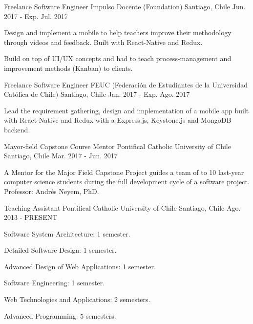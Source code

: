 \begin{cventries}
  \cventry
    {Freelance Software Engineer}
    {Impulso Docente (Foundation)}
    {Santiago, Chile}
    {Jun. 2017 - Exp. Jul. 2017}
    {
      \begin{cvitems}
        \item {Design and implement a mobile to help teachers improve their methodology through videos and feedback. Built with React-Native and Redux.}
        \item {Build on top of UI/UX concepts and had to teach process-management and improvement methods (Kanban) to clients.}
      \end{cvitems}
    }
  \cventry
    {Freelance Software Engineer}
    {FEUC (Federación de Estudiantes de la Universidad Católica de Chile)}
    {Santiago, Chile}
    {Jan. 2017 - Exp. Ago. 2017}
    {
      \begin{cvitems}
        \item {Lead the requirement gathering, design and implementation of a mobile app built with React-Native and Redux with a Express.js, Keystone.js and MongoDB backend.}
      \end{cvitems}
    }
  \cventry
    {Mayor-field Capstone Course Mentor}
    {Pontifical Catholic University of Chile}
    {Santiago, Chile}
    {Mar. 2017 - Jun. 2017}
    {
      \begin{cvitems}
        \item {A Mentor for the Major Field Capstone Project guides a team of to 10 last-year computer science students during the full development cycle of a software project. Professor: Andrés Neyem, PhD.}
      \end{cvitems}
    }
  \cventry
    {Teaching Assistant}
    {Pontifical Catholic University of Chile}
    {Santiago, Chile}
    {Ago. 2013 - PRESENT}
    {
      \begin{cvitems}
        \item {Software System Architecture: 1 semester.}
        \item {Detailed Software Design: 1 semester.}
        \item {Advanced Design of Web Applications: 1 semester.}
        \item {Software Engineering: 1 semester.}
        \item {Web Technologies and Applications: 2 semesters.}
        \item {Advanced Programming: 5 semesters.}
      \end{cvitems}
}
\end{cventries}
